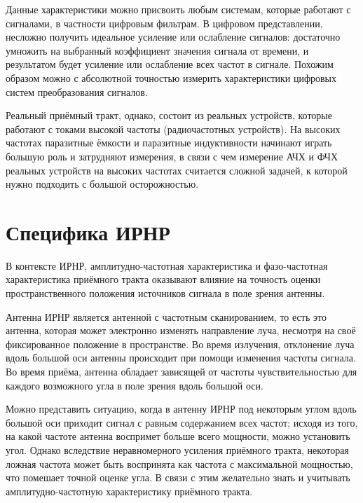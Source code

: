 \documentclass{report}
\begin{document}

Данные характеристики можно присвоить любым системам, которые работают с сигналами, в частности цифровым фильтрам. В цифровом представлении, несложно получить идеальное усиление или ослабление сигналов: достаточно умножить на выбранный коэффициент значения сигнала от времени, и результатом будет усиление или ослабление всех частот в сигнале. Похожим образом можно с абсолютной точностью измерить характеристики цифровых систем преобразования сигналов.

Реальный приёмный тракт, однако, состоит из реальных устройств, которые работают с токами высокой частоты (радиочастотных устройств). На высоких частотах паразитные ёмкости и паразитные индуктивности начинают играть большую роль и затрудняют измерения, в связи с чем измерение АЧХ и ФЧХ реальных устройств на высоких частотах считается сложной задачей, к которой нужно подходить с большой осторожностью.


\section{Специфика ИРНР}

В контексте ИРНР, амплитудно-частотная характеристика и фазо-частотная характеристика приёмного тракта оказывают влияние на точность оценки пространственного положения источников сигнала в поле зрения антенны.

Антенна ИРНР является антенной с частотным сканированием, то есть это антенна, которая может электронно изменять направление луча, несмотря на своё фиксированное положение в пространстве. Во время излучения, отклонение луча вдоль большой оси антенны происходит при помощи изменения частоты сигнала. Во время приёма, антенна обладает зависящей от частоты чувствительностью для каждого возможного угла в поле зрения вдоль большой оси.

Можно представить ситуацию, когда в антенну ИРНР под некоторым углом вдоль большой оси приходит сигнал с равным содержанием всех частот; исходя из того, на какой частоте антенна воспримет больше всего мощности, можно установить угол. Однако вследствие неравномерного усиления приёмного тракта, некоторая ложная частота может быть воспринята как частота с максимальной мощностью, что помешает точной оценке угла. В связи с этим желательно знать и учитывать амплитудно-частотную характеристику приёмного тракта.
\end{document}
